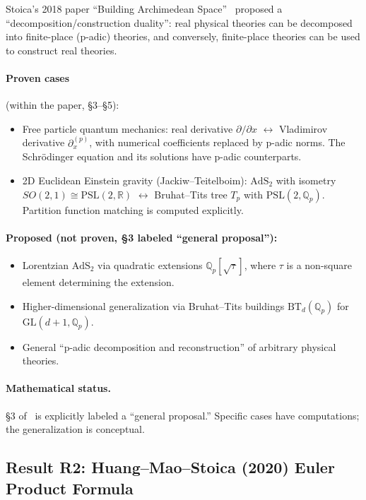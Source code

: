 \documentclass[11pt,a4paper]{article}
\newcommand{\Qp}{\mathbb{Q}_p}
\newcommand{\R}{\mathbb{R}}
\newcommand{\Tp}{T_p}
\newcommand{\GL}{\mathrm{GL}}
\newcommand{\PSL}{\mathrm{PSL}}
\newcommand{\AdS}{\mathrm{AdS}}
\newcommand{\BirTits}{Bruhat--Tits}
\begin{document}
Stoica's 2018 paper ``Building Archimedean Space''~\cite{S18} proposed a ``decomposition/construction duality'': real physical theories can be decomposed into finite-place (p-adic) theories, and conversely, finite-place theories can be used to construct real theories.

\paragraph{Proven cases} (within the paper, \S3--\S5):
\begin{itemize}[leftmargin=2em]
    \item Free particle quantum mechanics: real derivative $\partial/\partial x$ $\leftrightarrow$ Vladimirov derivative $\partial^{(p)}_x$, with numerical coefficients replaced by p-adic norms. The Schr\"odinger equation and its solutions have p-adic counterparts.
    \item 2D Euclidean Einstein gravity (Jackiw--Teitelboim): $\AdS_2$ with isometry $SO(2,1) \cong \PSL(2,\R)$ $\leftrightarrow$ \BirTits{} tree $\Tp$ with $\PSL(2,\Qp)$. Partition function matching is computed explicitly.
\end{itemize}

\paragraph{Proposed (not proven, \S3 labeled ``general proposal''):}
\begin{itemize}[leftmargin=2em]
    \item Lorentzian $\AdS_2$ via quadratic extensions $\Qp[\sqrt{\tau}]$, where $\tau$ is a non-square element determining the extension.
    \item Higher-dimensional generalization via \BirTits{} buildings $\mathrm{BT}_d(\Qp)$ for $\GL(d+1, \Qp)$.
    \item General ``p-adic decomposition and reconstruction'' of arbitrary physical theories.
\end{itemize}

\paragraph{Mathematical status.}
\S3 of~\cite{S18} is explicitly labeled a ``general proposal.'' Specific cases have computations; the generalization is conceptual.

\subsection{Result R2: Huang--Mao--Stoica (2020) Euler Product Formula}
\end{document}
